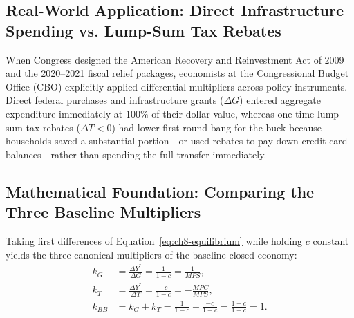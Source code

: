 \documentclass[11pt,letterpaper]{article}
\begin{document}
\subsection*{Real-World Application: Direct Infrastructure Spending vs. Lump-Sum Tax Rebates}
When Congress designed the American Recovery and Reinvestment Act of 2009 and the 2020--2021 fiscal relief packages, economists at the Congressional Budget Office (CBO) explicitly applied differential multipliers across policy instruments. Direct federal purchases and infrastructure grants ($\Delta G$) entered aggregate expenditure immediately at $100\%$ of their dollar value, whereas one-time lump-sum tax rebates ($\Delta T < 0$) had lower first-round bang-for-the-buck because households saved a substantial portion—or used rebates to pay down credit card balances—rather than spending the full transfer immediately.

\subsection*{Mathematical Foundation: Comparing the Three Baseline Multipliers}
Taking first differences of Equation~\eqref{eq:ch8-equilibrium} while holding $c$ constant yields the three canonical multipliers of the baseline closed economy:
\begin{align}
k_G &= \frac{\Delta Y^*}{\Delta G} = \frac{1}{1 - c} = \frac{1}{MPS}, \label{eq:ch8-kg} \\
k_T &= \frac{\Delta Y^*}{\Delta T} = \frac{-c}{1 - c} = -\frac{MPC}{MPS}, \label{eq:ch8-kt} \\
k_{BB} &= k_G + k_T = \frac{1}{1 - c} + \frac{-c}{1 - c} = \frac{1 - c}{1 - c} = 1. \label{eq:ch8-kbb}
\end{align}
\end{document}
